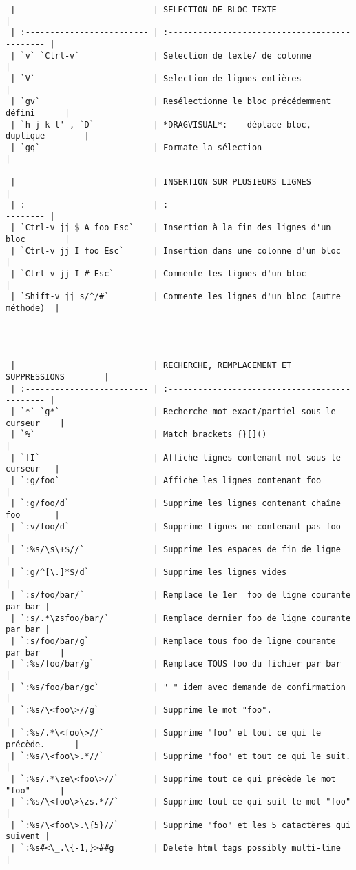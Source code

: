 \documentclass[10pt,landscape]{article}
\begin{document}
\begin{multicols}{2}
\begin{verbatim}
 |                            | SELECTION DE BLOC TEXTE                        |
 | :------------------------- | :--------------------------------------------- |
 | `v` `Ctrl-v`               | Selection de texte/ de colonne                 |
 | `V`                        | Selection de lignes entières                   |
 | `gv`                       | Resélectionne le bloc précédemment défini      |
 | `h j k l' , `D`            | *DRAGVISUAL*:    déplace bloc, duplique        |
 | `gq`                       | Formate la sélection                           |

 |                            | INSERTION SUR PLUSIEURS LIGNES                 |
 | :------------------------- | :--------------------------------------------- |
 | `Ctrl-v jj $ A foo Esc`    | Insertion à la fin des lignes d'un bloc        |
 | `Ctrl-v jj I foo Esc`      | Insertion dans une colonne d'un bloc           |
 | `Ctrl-v jj I # Esc`        | Commente les lignes d'un bloc                  |
 | `Shift-v jj s/^/#`         | Commente les lignes d'un bloc (autre méthode)  |




 |                            | RECHERCHE, REMPLACEMENT ET SUPPRESSIONS        |
 | :------------------------- | :--------------------------------------------- |
 | `*` `g*`                   | Recherche mot exact/partiel sous le curseur    |
 | `%`                        | Match brackets {}[]()                          |
 | `[I`                       | Affiche lignes contenant mot sous le curseur   |
 | `:g/foo`                   | Affiche les lignes contenant foo               |
 | `:g/foo/d`                 | Supprime les lignes contenant chaîne foo       |
 | `:v/foo/d`                 | Supprime lignes ne contenant pas foo           |
 | `:%s/\s\+$//`              | Supprime les espaces de fin de ligne           |
 | `:g/^[\.]*$/d`             | Supprime les lignes vides                      |
 | `:s/foo/bar/`              | Remplace le 1er  foo de ligne courante par bar |
 | `:s/.*\zsfoo/bar/`         | Remplace dernier foo de ligne courante par bar |
 | `:s/foo/bar/g`             | Remplace tous foo de ligne courante par bar    |
 | `:%s/foo/bar/g`            | Remplace TOUS foo du fichier par bar           |
 | `:%s/foo/bar/gc`           | " " idem avec demande de confirmation          |
 | `:%s/\<foo\>//g`           | Supprime le mot "foo".                         |
 | `:%s/.*\<foo\>//`          | Supprime "foo" et tout ce qui le précède.      |
 | `:%s/\<foo\>.*//`          | Supprime "foo" et tout ce qui le suit.         |
 | `:%s/.*\ze\<foo\>//`       | Supprime tout ce qui précède le mot "foo"      |
 | `:%s/\<foo\>\zs.*//`       | Supprime tout ce qui suit le mot "foo"         |
 | `:%s/\<foo\>.\{5}//`       | Supprime "foo" et les 5 catactères qui suivent |
 | `:%s#<\_.\{-1,}>##g        | Delete html tags possibly multi-line           |


\end{verbatim}
\end{multicols}
\end{document}
